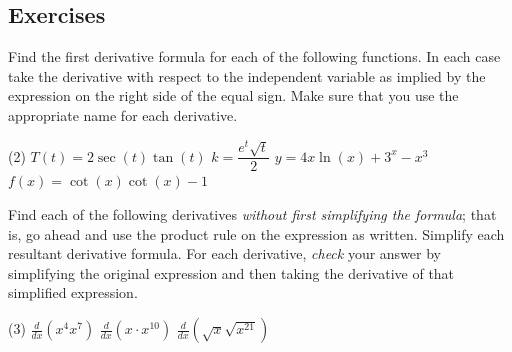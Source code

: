\documentclass[12pt,]{book}
\theoremstyle{plain}
\theoremstyle{definition}
\numberwithin{equation}{section}
\newcommand{\fe}[2]{#1\mathopen{}\left(#2\right)\mathclose{}}
\newcommand{\lzoo}[2]{{\frac{d}{d#1}}{\left(#2\right)}}
\begin{document}
\subsection[Exercises]{Exercises}\label{exercises-37}
\hypertarget{exercisegroup-76}{\null}Find the first derivative formula for each of the following functions.  In each case take the derivative with respect to the independent variable as implied by the expression on the right side of the equal sign.  Make sure that you use the appropriate name for each derivative.%
\par
\begin{exercisegroup}(2)
\exercise[1.]\hypertarget{exercise-371}{\null}\(\fe{T}{t}=2\fe{\sec}{t}\fe{\tan}{t}\)%
\exercise[2.]\hypertarget{exercise-372}{\null}\(k=\dfrac{e^t\sqrt{t}}{2}\)%
\exercise[3.]\hypertarget{exercise-373}{\null}\(y=4x\fe{\ln}{x}+3^x-x^3\)%
\exercise[4.]\hypertarget{exercise-374}{\null}\(\fe{f}{x}=\fe{\cot}{x}\fe{\cot}{x}-1\)%
\end{exercisegroup}
\par\smallskip\noindent
\hypertarget{exercisegroup-unsimplified-product}{\null}Find each of the following derivatives \emph{without first simplifying the formula}; that is, go ahead and use the product rule on the expression as written. Simplify each resultant derivative formula.  For each derivative, \emph{check} your answer by simplifying the original expression and then taking the derivative of that simplified expression.%
\par
\begin{exercisegroup}(3)
\exercise[5.]\hypertarget{unsimplified-product-first}{\null}\(\lzoo{x}{x^4x^7}\)%
\exercise[6.]\hypertarget{exercise-376}{\null}\(\lzoo{x}{x\cdot x^{10}}\)%
\exercise[7.]\hypertarget{unsimplified-product-last}{\null}\(\lzoo{x}{\sqrt{x}\sqrt{x^{21}}}\)%
\end{exercisegroup}
\par\smallskip\noindent
\typeout{************************************************}
\typeout{************************************************}
\end{document}
